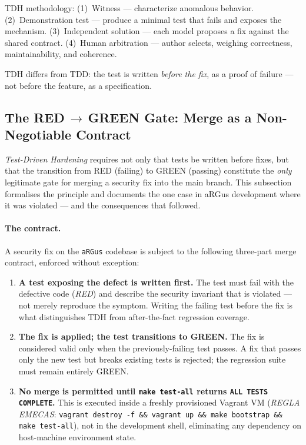 \documentclass[11pt,a4paper]{article}
\begin{document}
    TDH methodology: (1)~Witness --- characterize anomalous behavior. (2)~Demonstration test ---
    produce a minimal test that fails and exposes the mechanism. (3)~Independent solution ---
    each model proposes a fix against the shared contract. (4)~Human arbitration --- author
    selects, weighing correctness, maintainability, and coherence.

    TDH differs from TDD: the test is written \emph{before the fix}, as a proof of failure ---
    not before the feature, as a specification.



    \subsection{The RED\,$\to$\,GREEN Gate: Merge as a Non-Negotiable Contract}
    \label{subsec:red-green-gate}

    \emph{Test-Driven Hardening} requires not only that tests be written before fixes,
    but that the transition from RED (failing) to GREEN (passing) constitute the
    \emph{only} legitimate gate for merging a security fix into the main branch.
    This subsection formalises the principle and documents the one case in
    aRGus development where it was violated --- and the consequences that followed.

    \paragraph{The contract.}
    A security fix on the \texttt{aRGus} codebase is subject to the following
    three-part merge contract, enforced without exception:

    \begin{enumerate}
        \item \textbf{A test exposing the defect is written first.}
        The test must fail with the defective code (\emph{RED}) and describe
        the security invariant that is violated --- not merely reproduce the
        symptom. Writing the failing test before the fix is what distinguishes
        TDH from after-the-fact regression coverage.

        \item \textbf{The fix is applied; the test transitions to GREEN.}
        The fix is considered valid only when the previously-failing test passes.
        A fix that passes only the new test but breaks existing tests is rejected;
        the regression suite must remain entirely GREEN.

        \item \textbf{No merge is permitted until \texttt{make test-all} returns
        \texttt{ALL TESTS COMPLETE}.}
        This is executed inside a freshly provisioned Vagrant VM
        (\emph{REGLA EMECAS}: \texttt{vagrant destroy -f \&\& vagrant up \&\&
        make bootstrap \&\& make test-all}), not in the development shell,
        eliminating any dependency on host-machine environment state.
    \end{enumerate}
\end{document}
